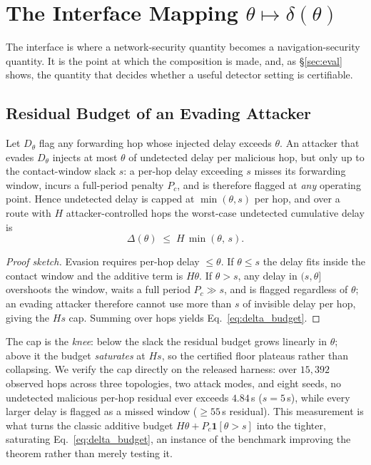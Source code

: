 \section{The Interface Mapping $\theta \mapsto \delta(\theta)$}
\label{sec:interface}
The interface is where a network-security quantity becomes a navigation-security
quantity. It is the point at which the composition is made, and, as
\S\ref{sec:eval} shows, the quantity that decides whether a useful detector setting is
certifiable.

\subsection{Residual Budget of an Evading Attacker}
\begin{lemma}
\label{lem:residual}
Let $D_\theta$ flag any forwarding hop whose injected delay exceeds $\theta$. An
attacker that evades $D_\theta$ injects at most $\theta$ of undetected delay per
malicious hop, but only up to the contact-window slack $s$: a per-hop delay
exceeding $s$ misses its forwarding window, incurs a full-period penalty
$P_{\!c}$, and is therefore flagged at \emph{any} operating point. Hence
undetected delay is capped at $\min(\theta,s)$ per hop, and over a route with
$H$ attacker-controlled hops the worst-case undetected cumulative delay is
\begin{equation}
\label{eq:delta_budget}
\Delta(\theta) \;\le\; H\,\min(\theta,\,s).
\end{equation}
\end{lemma}
\begin{proof}[Proof sketch]
Evasion requires per-hop delay $\le\theta$. If $\theta\le s$ the delay fits
inside the contact window and the additive term is $H\theta$. If $\theta>s$, any
delay in $(s,\theta]$ overshoots the window, waits a full period
$P_{\!c}\gg s$, and is flagged regardless of $\theta$; an evading attacker
therefore cannot use more than $s$ of invisible delay per hop, giving the $Hs$
cap. Summing over hops yields Eq.~\eqref{eq:delta_budget}.
\end{proof}

The cap is the \emph{knee}: below the slack the residual budget grows linearly
in $\theta$; above it the budget \emph{saturates} at $Hs$, so the certified
floor plateaus rather than collapsing. We verify the cap directly on the
released harness: over $15{,}392$ observed hops across three topologies, two
attack modes, and eight seeds, no undetected malicious per-hop residual ever
exceeds $4.84$\,s ($s=5$\,s), while every larger delay is flagged as a missed
window ($\ge55$\,s residual). This measurement is what turns the classic
additive budget $H\theta+P_{\!c}\mathbf{1}[\theta>s]$ into the tighter,
saturating Eq.~\eqref{eq:delta_budget}, an instance of the benchmark improving the
theorem rather than merely testing it.

